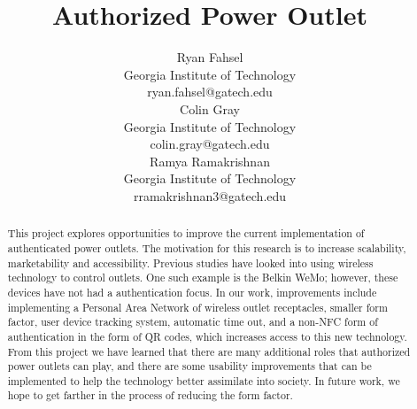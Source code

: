 \documentclass{sigchi}
\begin{document}
\title{Authorized Power Outlet}

\author{
  \alignauthor Ryan Fahsel\\
    \affaddr Georgia Institute of Technology\\
    \email ryan.fahsel@gatech.edu\\
  \alignauthor Colin Gray\\
    \affaddr Georgia Institute of Technology\\
    \email colin.gray@gatech.edu\\
  \alignauthor Ramya Ramakrishnan\\
    \affaddr Georgia Institute of Technology\\
    \email rramakrishnan3@gatech.edu\\
}

\maketitle

\begin{abstract}
This project explores opportunities to improve the current implementation of authenticated power outlets. The motivation for this research is to increase scalability, marketability and accessibility.  Previous studies have looked into using wireless technology to control outlets. One such example is the Belkin WeMo; however, these devices have not had a authentication focus. In our work, improvements include implementing a Personal Area Network of wireless outlet receptacles, smaller form factor, user device tracking system, automatic time out, and a non-NFC form of authentication in the form of QR codes, which increases access to this new technology. From this project we have learned that there are many additional roles that authorized power outlets can play, and there are some usability improvements that can be implemented to help the technology better assimilate into society. In future work, we hope to get farther in the process of reducing the form factor.
\end{abstract}

\end{document}
